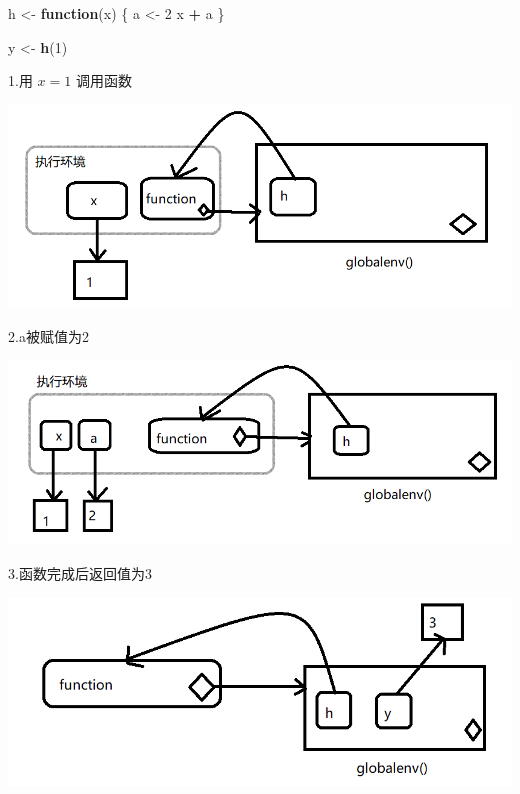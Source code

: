 \documentclass[]{book}
\newenvironment{Shaded}{\begin{snugshade}}{\end{snugshade}}
\newcommand{\KeywordTok}[1]{\textcolor[rgb]{0.13,0.29,0.53}{\textbf{#1}}}
\newcommand{\DecValTok}[1]{\textcolor[rgb]{0.00,0.00,0.81}{#1}}
\newcommand{\StringTok}[1]{\textcolor[rgb]{0.31,0.60,0.02}{#1}}
\newcommand{\ControlFlowTok}[1]{\textcolor[rgb]{0.13,0.29,0.53}{\textbf{#1}}}
\newcommand{\OperatorTok}[1]{\textcolor[rgb]{0.81,0.36,0.00}{\textbf{#1}}}
\newcommand{\NormalTok}[1]{#1}
\begin{document}
\begin{Shaded}
\begin{Highlighting}[]
\NormalTok{h <-}\StringTok{ }\ControlFlowTok{function}\NormalTok{(x) \{}
\NormalTok{  a <-}\StringTok{ }\DecValTok{2}
\NormalTok{  x }\OperatorTok{+}\StringTok{ }\NormalTok{a}
\NormalTok{\}}

\NormalTok{y <-}\StringTok{ }\KeywordTok{h}\NormalTok{(}\DecValTok{1}\NormalTok{)}
\end{Highlighting}
\end{Shaded}

1.用 \(x=1\) 调用函数

\begin{center}\includegraphics{img/ch7-10} \end{center}

2.a被赋值为2

\begin{center}\includegraphics{img/ch7-11} \end{center}

3.函数完成后返回值为3

\begin{center}\includegraphics{img/ch7-12} \end{center}
\end{document}
